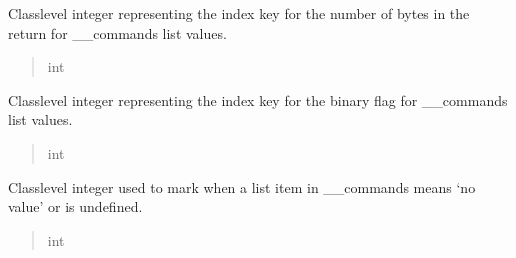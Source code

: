 \documentclass[letterpaper,10pt,english]{sphinxmanual}
\begin{document}
\begin{fulllineitems}
\begin{fulllineitems}
\label{\detokenize{PodCommands:PodCommands.POD_Commands.__RETURNS}}
\pysigstartsignatures
{}
\pysigstopsignatures
\sphinxAtStartPar
Class\sphinxhyphen{}level integer representing the index key for the number of bytes in the             return for \_\_commands list values.
\begin{quote}\begin{description}
\sphinxAtStartPar
int

\end{description}\end{quote}

\end{fulllineitems}


\begin{fulllineitems}
\label{\detokenize{PodCommands:PodCommands.POD_Commands.__BINARY}}
\pysigstartsignatures
{}
\pysigstopsignatures
\sphinxAtStartPar
Class\sphinxhyphen{}level integer representing the index key for the binary flag for \_\_commands             list values.
\begin{quote}\begin{description}
\sphinxAtStartPar
int

\end{description}\end{quote}

\end{fulllineitems}


\begin{fulllineitems}
\label{\detokenize{PodCommands:PodCommands.POD_Commands.__NOVALUE}}
\pysigstartsignatures
{}
\pysigstopsignatures
\sphinxAtStartPar
Class\sphinxhyphen{}level integer used to mark when a list item in \_\_commands means ‘no value’             or is undefined.
\begin{quote}\begin{description}
\sphinxAtStartPar
int


\end{description}
\end{quote}
\end{fulllineitems}
\end{fulllineitems}
\end{document}

